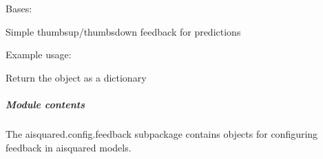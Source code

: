\documentclass[letterpaper,10pt,english]{sphinxmanual}
\begin{document}
\begin{fulllineitems}
\label{\detokenize{aisquared.config.feedback:aisquared.config.feedback.SimpleFeedback.SimpleFeedback}}
\pysigstartsignatures
{}
\pysigstopsignatures
\sphinxAtStartPar
Bases: 

\sphinxAtStartPar
Simple thumbs\sphinxhyphen{}up/thumbs\sphinxhyphen{}down feedback for predictions

\sphinxAtStartPar
Example usage:

\begin{sphinxVerbatim}[commandchars=\\\{\}]
 
  
\end{sphinxVerbatim}

\begin{fulllineitems}
\label{\detokenize{aisquared.config.feedback:aisquared.config.feedback.SimpleFeedback.SimpleFeedback.to_dict}}
\pysigstartsignatures
{}
\pysigstopsignatures
\sphinxAtStartPar
Return the object as a dictionary

\end{fulllineitems}


\end{fulllineitems}



\subparagraph{Module contents}
\label{\detokenize{aisquared.config.feedback:module-aisquared.config.feedback}}\label{\detokenize{aisquared.config.feedback:module-contents}}
\sphinxAtStartPar
The aisquared.config.feedback subpackage contains objects for configuring feedback in aisquared models.
\end{document}
